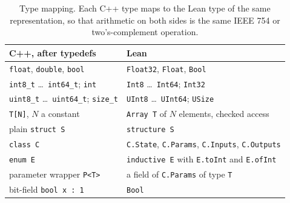 \begin{table}[t]
\caption{\textnormal{Type mapping. Each C++ type maps to the Lean type of the same representation, so that arithmetic on both sides is the same IEEE 754 or two's-complement operation.}}
\label{tab:types}
\footnotesize
\setlength{\tabcolsep}{4pt}
\begin{tabular}{@{}ll@{}}
\toprule
C++, after typedefs & Lean \\
\midrule
\texttt{float}, \texttt{double}, \texttt{bool} & \texttt{Float32}, \texttt{Float}, \texttt{Bool} \\
\texttt{int8\_t} \ldots\ \texttt{int64\_t}; \texttt{int} & \texttt{Int8} \ldots\ \texttt{Int64}; \texttt{Int32} \\
\texttt{uint8\_t} \ldots\ \texttt{uint64\_t}; \texttt{size\_t} & \texttt{UInt8} \ldots\ \texttt{UInt64}; \texttt{USize} \\
\texttt{T[N]}, $N$ a constant & \texttt{Array T} of $N$ elements, checked access \\
plain \texttt{struct S} & \texttt{structure S} \\
\texttt{class C} & \texttt{C.State}, \texttt{C.Params}, \texttt{C.Inputs}, \texttt{C.Outputs} \\
\texttt{enum E} & \texttt{inductive E} with \texttt{E.toInt} and \texttt{E.ofInt} \\
parameter wrapper \texttt{P<T>} & a field of \texttt{C.Params} of type \texttt{T} \\
bit-field \texttt{bool x : 1} & \texttt{Bool} \\
\bottomrule
\end{tabular}
\end{table}
